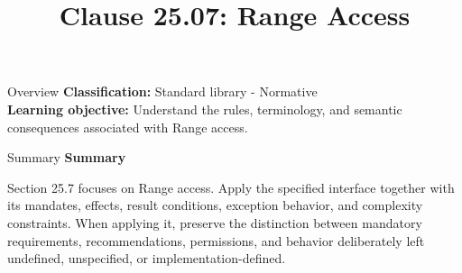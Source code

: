 \documentclass[10pt,letterpaper]{article}
\title{Clause 25.07: Range Access}
\author{}
\date{}
\begin{document}
\maketitle
\begin{CornellOverviewBox}{Overview}
\textbf{Classification:} Standard library - Normative\\[2pt]
\textbf{Learning objective:} Understand the rules, terminology, and semantic consequences associated with Range access.
\end{CornellOverviewBox}\begin{CornellSummaryBox}{Summary}
{\sffamily\bfseries\color{Accent} Summary}\par\vspace{3pt}Section 25.7 focuses on Range access. Apply the specified interface together with its mandates, effects, result conditions, exception behavior, and complexity constraints. When applying it, preserve the distinction between mandatory requirements, recommendations, permissions, and behavior deliberately left undefined, unspecified, or implementation-defined.
\end{CornellSummaryBox}
\end{document}
